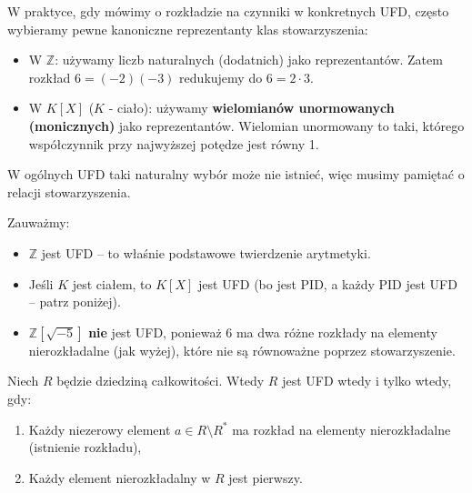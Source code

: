\begin{remark}
W praktyce, gdy mówimy o rozkładzie na czynniki w konkretnych UFD, często wybieramy pewne kanoniczne reprezentanty klas stowarzyszenia:
\begin{itemize}
    \item W $\mathbb{Z}$: używamy liczb naturalnych (dodatnich) jako reprezentantów. Zatem rozkład $6 = (-2)(-3)$ redukujemy do $6 = 2 \cdot 3$.
    \item W $K[X]$ ($K$ - ciało): używamy \textbf{wielomianów unormowanych (monicznych)} jako reprezentantów. Wielomian unormowany to taki, którego współczynnik przy najwyższej potędze jest równy 1.
\end{itemize}
W ogólnych UFD taki naturalny wybór może nie istnieć, więc musimy pamiętać o relacji stowarzyszenia.
\end{remark}

\begin{eg}
Zauważmy:
\begin{itemize}
    \item $\mathbb{Z}$ jest UFD – to właśnie podstawowe twierdzenie arytmetyki.
    \item Jeśli $K$ jest ciałem, to $K[X]$ jest UFD (bo jest PID, a każdy PID jest UFD – patrz poniżej).
    \item $\mathbb{Z}[\sqrt{-5}]$ \textbf{nie} jest UFD, ponieważ $6$ ma dwa różne rozkłady na elementy nierozkładalne (jak wyżej), które nie są równoważne poprzez stowarzyszenie.
\end{itemize}

\end{eg}

\begin{theorem}
Niech $R$ będzie dziedziną całkowitości. Wtedy $R$ jest UFD wtedy i tylko wtedy, gdy:
\begin{enumerate}[label=(\roman*)]
    \item Każdy niezerowy element $a \in R \setminus R^*$ ma rozkład na elementy nierozkładalne (istnienie rozkładu),
    \item Każdy element nierozkładalny w $R$ jest pierwszy.
\end{enumerate}
\end{theorem}

